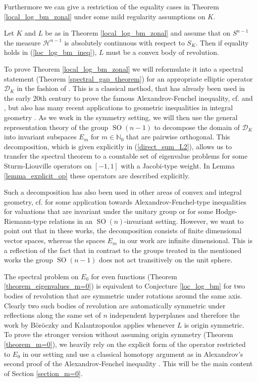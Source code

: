 \documentclass[12pt,twoside]{amsart}
\numberwithin{satz}{section}
\theoremstyle{definition}
\newenvironment{manualtheorem}[1]{%
	\renewcommand\themanualtheoreminner{#1}%
	\manualtheoreminner
}{\endmanualtheoreminner}
\numberwithin{equation}{section}
\newcommand\N{\mathbb{N}}
\newcommand\SO{\operatorname{SO}}
\begin{document}
	Furthermore we can give a restriction of the equality cases in Theorem \ref{local_log_bm_zonal} under some mild regularity assumptions on $K$.
	
	\begin{manualtheorem}{B}\label{equality_cases}
		Let $K$ and $L$ be as in Theorem \ref{local_log_bm_zonal} and assume that on $S^{n-1}$ the measure $\mathcal{H}^{n-1}$ is absolutely continuous with respect to $S_K$. Then if equality holds in (\ref{loc_log_bm_ineq}), $L$ must be a convex body of revolution.
	\end{manualtheorem}
	
	To prove Theorem \ref{local_log_bm_zonal} we will reformulate it into a spectral statement (Theorem \ref{spectral_gap_theorem}) for an appropriate elliptic operator $\mathcal{D}_K$ in the fashion of \cite{vanhandel}. This is a classical method, that has already been used in the early 20th century to prove the famous Alexandrov-Fenchel inequality, cf. \cite{aleksandrov1} and \cite{hilbert}, but also has many recent applications to geometric inequalities in integral geometry \cite{abardiawannerer, bernigkotrbatywannerer, kotrbatywannerer}. As we work in the symmetry setting, we will then use the general representation theory of the group $\SO(n-1)$ to decompose the domain of $\mathcal{D}_K$ into invariant subspaces $E_m$ for ${m\in\N_0}$ that are pairwise orthogonal. This decomposition, which is given explicitly in (\ref{direct_sum_L2}), allows us to transfer the spectral theorem to a countable set of eigenvalue problems for some Sturm-Liouville operators on $[-1,1]$ with a Jacobi-type weight. In Lemma \ref{lemma_explicit_op} these operators are described explicitly. 
	
	Such a decomposition has also been used in other areas of convex and integral geometry, cf. \cite{abardiawannerer} for some application towards Alexandrov-Fenchel-type inequalities for valuations that are invariant under the unitary group or \cite{kotrbatywannerer} for some Hodge-Riemann-type relations in an $\SO(n)$-invariant setting. However, we want to point out that in these works, the decomposition consists of finite dimensional vector spaces, whereas the spaces $E_m$ in our work are infinite dimensional. This is a reflection of the fact that in contrast to the groups treated in the mentioned works the group $\SO(n-1)$ does not act transitively on the unit sphere.
	
	The spectral problem on $E_0$ for even functions (Theorem \ref{theorem_eigenvalues_m=0}) is equivalent to Conjecture \ref{loc_log_bm} for two bodies of revolution that are symmetric under rotations around the same axis. Clearly two such bodies of revolution are automatically symmetric under reflections along the same set of $n$ independent hyperplanes and therefore the work by Böröczky and Kalantzopoulos \cite{boeroeczkykalantzopoulos} applies whenever $L$ is origin symmetric. To prove the stronger version without assuming origin symmetry (Theorem \ref{theorem_m=0}), we heavily rely on the explicit form of the operator restricted to $E_0$ in our setting and use a classical homotopy argument as in Alexandrov's second proof of the Alexandrov-Fenchel inequality \cite{aleksandrov1}. This will be the main content of Section \ref{section_m=0}.
	
\end{document}

